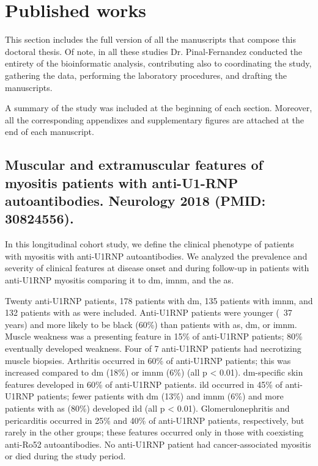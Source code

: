 \appendix
\chapter{Published works}
\label{chap:appendix}
This section includes the full version of all the manuscripts that compose this doctoral thesis. Of note, in all these studies Dr. Pinal-Fernandez conducted the entirety of the bioinformatic analysis, contributing also to coordinating the study, gathering the data, performing the laboratory procedures, and drafting the manuscripts.

A summary of the study was included at the beginning of each section. Moreover, all the corresponding appendixes and supplementary figures are attached at the end of each manuscript.

{\cleardoublepage}

\section{Muscular and extramuscular features of myositis patients with anti-U1-RNP autoantibodies. Neurology 2018 (PMID: 30824556).}
\label{sec:u1rnp}

In this longitudinal cohort study, we define the clinical phenotype of patients with myositis with anti-U1RNP autoantibodies. We analyzed the prevalence and severity of clinical features at disease onset and during follow-up in patients with anti-U1RNP myositis comparing it to \gls{dm}, \gls{imnm}, and the \gls{as}.

Twenty anti-U1RNP patients, 178 patients with \gls{dm}, 135 patients with \gls{imnm}, and 132 patients with \gls{as} were included. Anti-U1RNP patients were younger (~37 years) and more likely to be black (60\%) than patients with \gls{as}, \gls{dm}, or \gls{imnm}. Muscle weakness was a presenting feature in 15\% of anti-U1RNP patients; 80\% eventually developed weakness. Four of 7 anti-U1RNP patients had necrotizing muscle biopsies. Arthritis occurred in 60\% of anti-U1RNP patients; this was increased compared to \gls{dm} (18\%) or \gls{imnm} (6\%) (all p < 0.01). \gls{dm}-specific skin features developed in 60\% of anti-U1RNP patients. \gls{ild} occurred in 45\% of anti-U1RNP patients; fewer patients with \gls{dm} (13\%) and \gls{imnm} (6\%) and more patients with \gls{as} (80\%) developed \gls{ild} (all p < 0.01). Glomerulonephritis and pericarditis occurred in 25\% and 40\% of anti-U1RNP patients, respectively, but rarely in the other groups; these features occurred only in those with coexisting anti-Ro52 autoantibodies. No anti-U1RNP patient had cancer-associated myositis or died during the study period.

